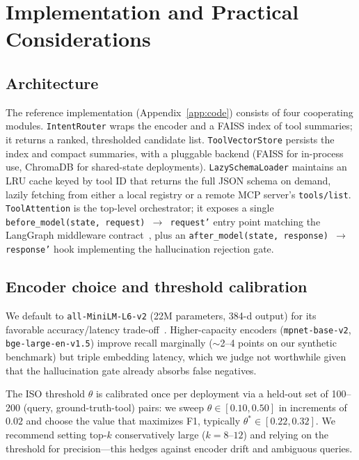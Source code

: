 \documentclass[11pt]{article}
\begin{document}
\section{Implementation and Practical Considerations}\label{sec:implementation}

\subsection{Architecture}

The reference implementation (Appendix~\ref{app:code}) consists of four cooperating modules. \texttt{IntentRouter} wraps the encoder and a FAISS index of tool summaries; it returns a ranked, thresholded candidate list. \texttt{ToolVectorStore} persists the index and compact summaries, with a pluggable backend (FAISS for in-process use, ChromaDB for shared-state deployments). \texttt{LazySchemaLoader} maintains an LRU cache keyed by tool ID that returns the full JSON schema on demand, lazily fetching from either a local registry or a remote MCP server's \texttt{tools/list}. \texttt{ToolAttention} is the top-level orchestrator; it exposes a single \texttt{before\_model(state, request) $\to$ request'} entry point matching the LangGraph middleware contract~\citep{langchain2026middleware,microsoft2026semantickernel}, plus an \texttt{after\_model(state, response) $\to$ response'} hook implementing the hallucination rejection gate.

\subsection{Encoder choice and threshold calibration}

We default to \texttt{all-MiniLM-L6-v2} (22M parameters, 384-d output) for its favorable accuracy/latency trade-off~\citep{reimers2019sbert}. Higher-capacity encoders (\texttt{mpnet-base-v2}, \texttt{bge-large-en-v1.5}) improve recall marginally ($\sim$2--4 points on our synthetic benchmark) but triple embedding latency, which we judge not worthwhile given that the hallucination gate already absorbs false negatives.

The ISO threshold $\theta$ is calibrated once per deployment via a held-out set of 100--200 (query, ground-truth-tool) pairs: we sweep $\theta \in [0.10, 0.50]$ in increments of $0.02$ and choose the value that maximizes F1, typically $\theta^* \in [0.22, 0.32]$. We recommend setting top-$k$ conservatively large ($k=8$--$12$) and relying on the threshold for precision---this hedges against encoder drift and ambiguous queries.
\end{document}
